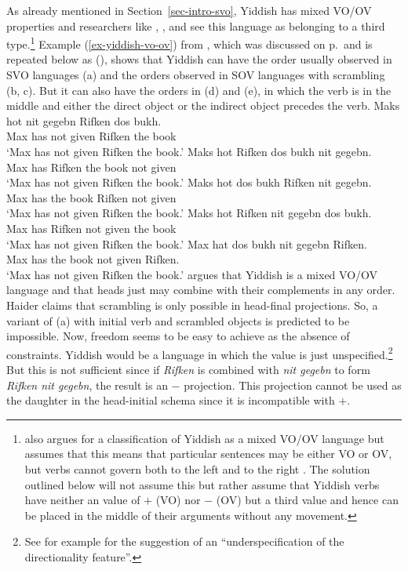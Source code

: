 As already mentioned in Section~\ref{sec-intro-svo}, Yiddish has mixed VO/OV properties and
researchers like \citet[]{dBMvW86a}, \citet[]{Schallert2007a}, and \textcites[]{Haider2010a}{Haider2020a} see
this language as belonging to a third type.\footnote{
  \textcites{Santorini93a} also argues for a classification of Yiddish as a mixed VO/OV language
  but assumes that this means that particular sentences may be either VO or OV, but verbs cannot
  govern both to the left and to the right \citet[]{Santorini93a}. The solution outlined below
  will not assume this but rather assume that Yiddish verbs have neither an \initial value of $+$
  (VO) nor $-$ (OV) but a third value and hence can be placed in the middle of their arguments
  without any movement.
} Example (\ref{ex-yiddish-vo-ov}) from \citet[]{Diesing97a}, which was discussed on p.\,\pageref{ex-yiddish-vo-ov} and is repeated
below as (), shows that Yiddish can have the order usually observed in SVO languages
(a) and the orders observed in SOV languages with scrambling (b, c). But it can also
have the orders in (d) and (e), in which the verb is in the middle and either the
direct object or the indirect object precedes the verb.
\eal
\ex
\gll Maks hot nit gegebn Rifken dos bukh.\\
     Max  has not given  Rifken the book\\\yiddish
\glt `Max has not given Rifken the book.' 
\ex 
\gll Maks hot Rifken dos bukh nit gegebn.\\
     Max  has Rifken the book not given\\
\glt `Max has not given Rifken the book.'
\ex
\gll Maks hot dos bukh Rifken nit gegebn.\\
     Max  has the book Rifken not given\\
\glt `Max has not given Rifken the book.'
\ex
\gll Maks hot Rifken nit gegebn dos bukh.\\
     Max  has Rifken not given  the book\\
\glt `Max has not given Rifken the book.'
\ex
\glt Max hat dos bukh nit gegebn Rifken.\\
     Max has the book not given  Rifken.\\
\glt `Max has not given Rifken the book.'
\zl
\citet[]{Haider2010a} argues that Yiddish is a mixed VO/OV language and that heads just may
combine with their complements in any order. Haider claims that scrambling is only possible in
head-final projections. So, a variant of (a) with initial verb and scrambled objects is
predicted to be impossible.
 Now,
freedom seems to be easy to achieve as the absence of constraints. Yiddish would be a language in
which the \initial value is just unspecified.\footnote{
See for example  for the suggestion of an ``underspecification of the
directionality feature''.} 
But this is not sufficient since if \emph{Rifken} is
combined with \emph{nit gegebn} to form \emph{Rifken nit gegebn}, the result is an \initial{}$-$
projection. This projection cannot be used as the daughter in the head-initial schema since it is
incompatible with \initial{}$+$. 

